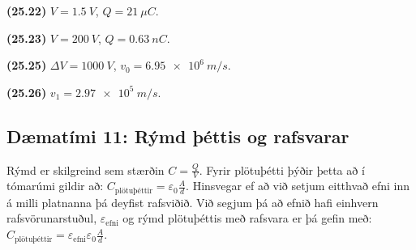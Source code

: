\ifdefined \wholebook \else\documentclass[oneside]{book}\usepackage{EdlBook}\graphicspath{{figures/}}
\begin{document}
\begin{tcolorbox}
\begin{enumerate*}[label = \vspace{0.15cm} ]
  \item \textbf{(25.22)} $V = \SI{1.5}{V}$, $Q = \SI{21}{\mu C}$.
  \item \textbf{(25.23)} $V = \SI{200}{V}$, $Q = \SI{0.63}{nC}$.
  \item \textbf{(25.25)} $\Delta V = \SI{1000}{V}$, $v_0 = \SI{6.95e6}{m/s}$.
  \item \textbf{(25.26)} $v_1 = \SI{2.97e5}{m/s}$.
\end{enumerate*}
\end{tcolorbox}

\newpage

\subsection*{Dæmatími 11: Rýmd þéttis og rafsvarar}


\begin{tcolorbox}
Rýmd er skilgreind sem stærðin $C = \frac{Q}{V}$. Fyrir plötuþétti þýðir þetta að í tómarúmi gildir að: $C_{\text{plötuþéttir}} = \varepsilon_0 \frac{A}{d}$. Hinsvegar ef að við setjum eitthvað efni inn á milli platnanna þá deyfist rafsviðið. Við segjum þá að efnið hafi einhvern rafsvörunarstuðul, $\varepsilon_{\text{efni}}$ og rýmd plötuþéttis með rafsvara er þá gefin með: $C_{\text{plötuþéttir}} = \varepsilon_{\text{efni}} \varepsilon_0 \frac{A}{d}$.
\end{tcolorbox}
\end{document}
